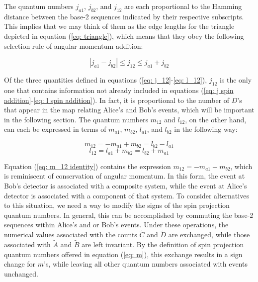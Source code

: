 \documentclass{article}
\begin{document}
The quantum numbers $j_{a1}$, $j_{b2}$, and $j_{12}$ are each proportional to the Hamming distance between the base-2 sequences indicated by their respective subscripts. This implies that we may think of them as the edge lengths for the triangle depicted in equation (\ref{eq: triangle}), which means that they obey the following selection rule of angular momentum addition:

\begin{equation}
    |j_{a1}-j_{b2}|\leq j_{12} \leq j_{a1}+j_{b2}
    \label{eq: triangle inequality}
\end{equation}

Of the three quantities defined in equations (\ref{eq: j_12}-\ref{eq: l_12}), $j_{12}$ is the only one that contains information not already included in equations (\ref{eq: j spin addition}-\ref{eq: l spin addition}). In fact, it is proportional to the number of $D$'s that appear in the map relating Alice's and Bob's events, which will be important in the following section. The quantum numbers $m_{12}$ and $l_{12}$, on the other hand, can each be expressed in terms of $m_{a1}$, $m_{b2}$, $l_{a1}$, and $l_{b2}$ in the following way:

\begin{equation}
m_{12}=-m_{a1}+m_{b2}=l_{b2}-l_{a1}\label{eq: m_12 identity}
\end{equation}
\begin{equation}
l_{12}=l_{a1}+m_{b2}=l_{b2}+m_{a1}\label{eq: l_12 identity}
\end{equation}

Equation (\ref{eq: m_12 identity}) contains the expression $m_{12}=-m_{a1}+m_{b2}$, which is reminiscent of conservation of angular momentum. In this form, the event at Bob's detector is associated with a composite system, while the event at Alice's detector is associated with a component of that system. To consider alternatives to this situation, we need a way to modify the signs of the spin projection quantum numbers. In general, this can be accomplished by commuting the base-2 sequences within Alice's and or Bob's events. Under these operations, the numerical values associated with the counts $\tilde{C}$ and $\tilde{D}$ are exchanged, while those associated with $\tilde{A}$ and $\tilde{B}$ are left invariant. By the definition of spin projection quantum numbers offered in equation (\ref{eq: m}), this exchange results in a sign change for $m$'s, while leaving all other quantum numbers associated with events unchanged. 
\end{document}
